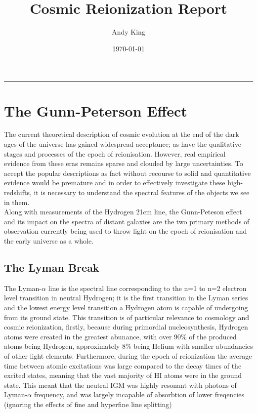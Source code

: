 \documentclass[pdf,color]{UoBnote}
\author{Andy King}
\title{Cosmic Reionization Report}
\date{\today}
\begin{document}
\maketitle
\tableofcontents
\vspace{1cm}\hrule \vspace{1cm}

\section{The Gunn-Peterson Effect}	%

The current theoretical description of cosmic evolution at the end of the dark ages of the universe has gained widespread acceptance; as have the qualitative stages and processes of the epoch of reionisation. However, real empirical evidence from these eras remains sparse and clouded by large uncertainties. To accept the popular descriptions as fact without recourse to solid and quantitative evidence would be premature and in order to effectively investigate these high-redshifts, it is necessary to understand the spectral features of the objects we see in them. \\

Along with measurements of the Hydrogen 21cm line, the Gunn-Peteson effect and its impact on the spectra of distant galaxies are the two primary methods of observation currently being used to throw light on the epoch of reionisation and the early universe as a whole.

\subsection{The Lyman Break}	%

The Lyman-$\alpha$ line is the spectral line corresponding to the n=1 to n=2 electron level transition in neutral Hydrogen; it is the first transition in the Lyman series and the lowest energy level transition a Hydrogen atom is capable of undergoing from its ground state. This transition is of particular relevance to cosmology and cosmic reionization, firstly, because during primordial nucleosynthesis, Hydrogen atoms were created in the greatest abunance, with over 90\% of the produced atoms being Hydrogen, approximately 8\% being Helium with smaller abundancies of other light elements. Furthermore, during the epoch of reionization the average time between atomic excitations was large compared to the decay times of the excited states, meaning that the vast majority of HI atoms were in the ground state. This meant that the neutral IGM was highly resonant with photons of Lyman-$\alpha$ frequency, and was largely incapable of absorbtion of lower freqencies (ignoring the effects of fine and hyperfine line splitting)      \\
\end{document}
